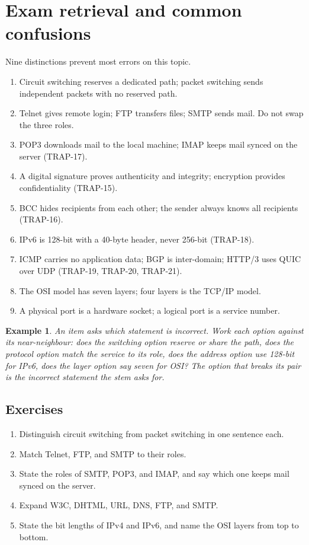 \documentclass[11pt]{article}
\newtheorem{example}{Example}[section]
\begin{document}
\section{Exam retrieval and common confusions}
Nine distinctions prevent most errors on this topic.
\begin{enumerate}
  \item Circuit switching reserves a dedicated path; packet switching sends
    independent packets with no reserved path.
  \item Telnet gives remote login; FTP transfers files; SMTP sends mail. Do
    not swap the three roles.
  \item POP3 downloads mail to the local machine; IMAP keeps mail synced on
    the server (TRAP-17).
  \item A digital signature proves authenticity and integrity; encryption
    provides confidentiality (TRAP-15).
  \item BCC hides recipients from each other; the sender always knows all
    recipients (TRAP-16).
  \item IPv6 is 128-bit with a 40-byte header, never 256-bit (TRAP-18).
  \item ICMP carries no application data; BGP is inter-domain; HTTP/3 uses
    QUIC over UDP (TRAP-19, TRAP-20, TRAP-21).
  \item The OSI model has seven layers; four layers is the TCP/IP model.
  \item A physical port is a hardware socket; a logical port is a service
    number.
\end{enumerate}

\begin{example}
An item asks which statement is incorrect. Work each option against its
near-neighbour: does the switching option reserve or share the path, does
the protocol option match the service to its role, does the address option
use 128-bit for IPv6, does the layer option say seven for OSI? The option
that breaks its pair is the incorrect statement the stem asks for.
\end{example}

\subsection*{Exercises}
\begin{enumerate}[label=\arabic*.]
  \item Distinguish circuit switching from packet switching in one sentence
    each.
  \item Match Telnet, FTP, and SMTP to their roles.
  \item State the roles of SMTP, POP3, and IMAP, and say which one keeps mail
    synced on the server.
  \item Expand W3C, DHTML, URL, DNS, FTP, and SMTP.
  \item State the bit lengths of IPv4 and IPv6, and name the OSI layers from
    top to bottom.
\end{enumerate}
\end{document}

